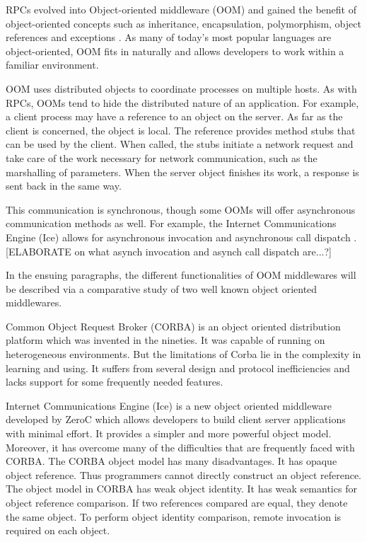 \documentclass{acm_proc_article-sp}
\begin{document}
RPCs evolved into Object-oriented middleware (OOM) and gained the benefit of object-oriented concepts such as inheritance, encapsulation, polymorphism, object references and exceptions \cite{Pinus:2006p8367} \cite{Vinoski:2004p8371}.  As many of today's most popular languages are object-oriented, OOM fits in naturally and allows developers to work within a familiar environment.  

OOM uses distributed objects to coordinate processes on multiple hosts.  As with RPCs, OOMs tend to hide the distributed nature of an application.  For example, a client process may have a reference to an object on the server.  As far as the client is concerned, the object is local.  The reference provides method stubs that can be used by the client.  When called, the stubs initiate a network request and take care of the work necessary for network communication, such as the marshalling of parameters.  When the server object finishes its work, a response is sent back in the same way.  

This communication is synchronous, though some OOMs will offer asynchronous communication methods as well.  For example, the Internet Communications Engine (Ice) allows for asynchronous invocation and asynchronous call dispatch \cite{Henning:2004p8372}.  [ELABORATE on what asynch invocation and asynch call dispatch are...?]

In the ensuing paragraphs, the different functionalities of OOM middlewares will be described via a comparative study of two well known object oriented middlewares\cite{Henning:2004p8372}.

Common Object Request Broker (CORBA) is an object oriented distribution platform which was invented in the nineties. It was capable of running on heterogeneous environments. But the limitations of Corba lie in the complexity in learning and using. It suffers from several design and protocol inefficiencies and lacks support for some frequently needed features.

Internet Communications Engine (Ice) is a new object oriented middleware developed by ZeroC which allows developers to build client server applications with minimal effort. It provides a simpler and more powerful object model. Moreover, it has overcome many of the difficulties that are frequently faced with CORBA. 
The CORBA object model has many disadvantages. It has opaque object reference. Thus programmers cannot directly construct an object reference. The object model in CORBA has weak object identity. It has weak semantics for object reference comparison. If two references compared are equal, they denote the same object. To perform object identity comparison, remote invocation is required on each object.
\end{document}
